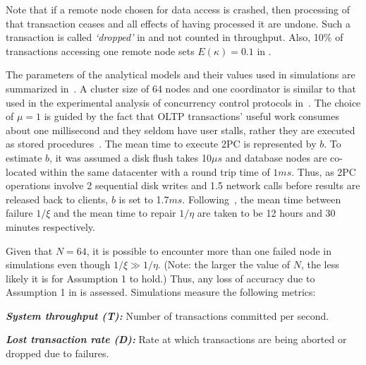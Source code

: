 Note that if a remote node chosen for data access is crashed, then processing of that transaction ceases and 
all effects of having processed it are undone. Such a transaction is called \emph{`dropped'} in 
 and not counted in throughput. Also, 10\% of transactions accessing one remote 
node sets $E(\kappa) = 0.1$ in .   

The parameters of the analytical models and their values used in simulations are summarized 
in~.
A cluster size of 64 nodes and one coordinator is similar to that used in the experimental analysis of 
concurrency control protocols in~\cite{harding}. The choice of $\mu = 1$ is guided by the fact that OLTP 
transactions' useful work consumes about one millisecond and they seldom have user stalls, rather they are 
executed as stored procedures~\cite{stonebraker}. The mean time to execute 2PC is represented by $b$. To
estimate $b$, it was assumed a disk flush takes 10$\mu s$ and database nodes are co-located within the same
datacenter with a round trip time of $1ms$. Thus, as 2PC operations involve 2 sequential disk writes and 1.5
network calls before results are released back to clients, $b$ is set to 1.7$ms$. Following~\cite{garraghan}, 
the mean time between failure $1/\xi$ and the mean time to repair $1/\eta$ are taken to be 12 hours and 30 
minutes respectively. 



Given that $N=64$, it is possible to encounter more than one failed node in simulations even though $1/\xi \gg 
1/\eta $. (Note: the larger the value of $N$, the less likely it is for Assumption 1 to hold.) Thus, any loss 
of accuracy due to Assumption 1 in  is assessed. Simulations measure the following 
metrics:

\noindent \textbf{\emph{System throughput (T):}} Number of transactions committed per second.

\noindent \textbf{\emph{Lost transaction rate (D):}} Rate at which transactions are being aborted or dropped 
due to failures.

